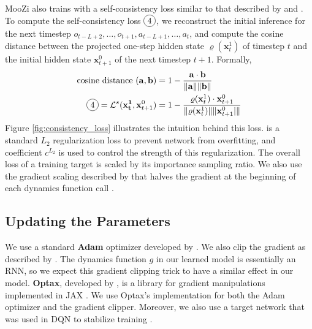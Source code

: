 MooZi also trains with a self-consistency loss similar to that described by \citeauthor{MasteringAtariGames_Ye.Liu.ea_2021} and \citeauthor{VisualizingMuZeroModels_deVries.Voskuil.ea_2021} \cite{MasteringAtariGames_Ye.Liu.ea_2021,VisualizingMuZeroModels_deVries.Voskuil.ea_2021}.
To compute the self-consistency loss $\circled{4}$, we reconstruct the initial inference for the next timestep \(o_{t-L+2}, \dots, o_{t+1}, a_{t-L+1}, \dots, a_{t}\), and compute the cosine distance between the projected one-step hidden state $\varrho(\mathbf{x}^1_t)$ of timestep $t$ and the initial hidden state $\mathbf{x}^0_{t+1}$ of the next timestep $t+1$.
Formally,
\begin{align*}
    \text{cosine distance} ~ (\mathbf{a}, \mathbf{b})
                                                                     & = 1 - \frac{\mathbf{a} \cdot \mathbf{b}}{\|\mathbf{a}\|\|\mathbf{b}\|}  \\
    \circled{4} = \mathcal{L}^s(\mathbf{x^1_t}, \mathbf{x}^0_{t+1})  & = 1 - \frac{\varrho(\mathbf{x}^1_t) \cdot \mathbf{x}^0_{t+1}}{\|\varrho(\mathbf{x}^1_t)\| \| \mathbf{x}^0_{t+1}|\|}
\end{align*}
Figure \ref{fig:consistency_loss} illustrates the intuition behind this loss.
 is a standard $L_2$ regularization loss to prevent network from overfitting,
and coefficient $c^{L_2}$ is used to control the strength of this regularization.
The overall loss of a training target is scaled by its importance sampling ratio.
We also use the gradient scaling described by \citeauthor{MasteringAtariGo_Schrittwieser.Antonoglou.ea_2020}
that halves the gradient at the beginning of each dynamics function call \cite{MasteringAtariGo_Schrittwieser.Antonoglou.ea_2020}.

\subsection{Updating the Parameters}
We use a standard \textbf{Adam} optimizer developed by \citeauthor{AdamMethodStochastic_Kingma.Ba_2017} \cite{AdamMethodStochastic_Kingma.Ba_2017}.
We also clip the gradient as described by \citeauthor{DifficultyTrainingRecurrent_Pascanu.Mikolov.ea_} \cite{DifficultyTrainingRecurrent_Pascanu.Mikolov.ea_}.
The dynamics function $g$ in our learned model is essentially an RNN, so we expect this gradient clipping trick to have a similar effect in our model.
\textbf{Optax}, developed by \citeauthor{OptaxComposableGradient_MatteoHessel.DavidBudden.ea_2020}, is a library for gradient manipulations implemented in JAX \cite{OptaxComposableGradient_MatteoHessel.DavidBudden.ea_2020}.
We use Optax's implementation for both the Adam optimizer and the gradient clipper.
Moreover, we also use a target network that was used in DQN to stabilize training \cite{PlayingAtariDeep_Mnih.Kavukcuoglu.ea_2013}.

